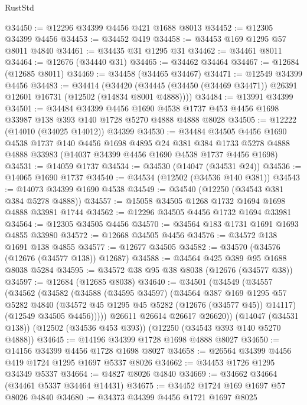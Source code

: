 \begin{lexlean}{RustStd}
\begin{coremodule}
@34450 := @12296 @34399 @4456 @421 @1688 @8013
@34452 := @12305 @34399 @4456
@34453 := @34452 @419
@34458 := @34453 @169 @1295 @57 @8011 @4840
@34461 := @34435 @31 @1295 @31
@34462 := @34461 @8011
@34464 := @12676 (@34440 @31)
@34465 := @34462 @34464
@34467 := @12684 (@12685 @8011)
@34469 := @34458 (@34465 @34467)
@34471 := @12549 @34399 @4456
@34483 := @34414
    (@34420 (@34445 (@34450 (@34469 @34471)) @26391 @12601 @16731 (@12502 (@14834 @8001 @4888))))
@34484 := @13991 @34399
@34501 := @34484
    @34399
    @4456
    @1690
    @4538
    @1737
    @453
    @4456
    @1698
    @33987
    @138
    @393
    @140
    @1728
    @5270
    @4888
    @4888
    @8028
@34505 := @12222 (@14010 (@34025 @14012)) @34399
@34530 := @34484
    @34505
    @4456
    @1690
    @4538
    @1737
    @140
    @4456
    @1698
    @4895
    @24
    @381
    @384
    @1733
    @5278
    @4888
    @4888
    @33983
    (@14037 @34399 @4456 @1690 @4538 @1737 @4456 @1698)
@34531 := @14059 @1737
@34534 := @34530 (@14047 (@34531 @24))
@34536 := @14065 @1690 @1737
@34540 := @34534 (@12502 (@34536 @140 @381))
@34543 := @14073 @34399 @1690 @4538
@34549 := @34540 (@12250 (@34543 @381 @384 @5278 @4888))
@34557 := @15058 @34505 @1268 @1732 @1694 @1698 @4888 @33981 @1744
@34562 := @12296 @34505 @4456 @1732 @1694 @33981
@34564 := @12305 @34505 @4456
@34570 := @34564 @183 @1731 @1691 @1693 @4855 @33980
@34572 := @12668 @34505 @4456
@34576 := @34572 @138 @1691 @138 @4855
@34577 := @12677 @34505
@34582 := @34570 (@34576 (@12676 (@34577 @138)) @12687)
@34588 := @34564 @425 @389 @95 @1688 @8038 @5284
@34595 := @34572 @38 @95 @38 @8038 (@12676 (@34577 @38))
@34597 := @12684 (@12685 @8038)
@34640 := @34501
    (@34549
      (@34557
        (@34562
          (@34582
            (@34588
              (@34595 @34597)
              (@34564
                @387
                @169
                @1295
                @57
                @5282
                @4840
                (@34572 @45 @1295 @45 @5282 (@12676 (@34577 @45)) @14117)
                (@12549 @34505 @4456)))))
        @26611
        @26614
        @26617
        @26620))
    (@14047 (@34531 @138))
    (@12502 (@34536 @453 @393))
    (@12250 (@34543 @393 @140 @5270 @4888))
@34645 := @14196 @34399 @1728 @1698 @4888 @8027
@34650 := @14156 @34399 @4456 @1728 @1698 @8027
@34658 := @26564 @34399 @4456 @419 @1724 @1295 @1697 @5337 @8026
@34662 := @34453 @1726 @1295 @34349 @5337
@34664 := @4827 @8026 @4840
@34669 := @34662 @34664 (@34461 @5337 @34464 @14431)
@34675 := @34452 @1724 @169 @1697 @57 @8026 @4840
@34680 := @34373 @34399 @4456 @1721 @1697 @8025

\end{coremodule}
\end{lexlean}
